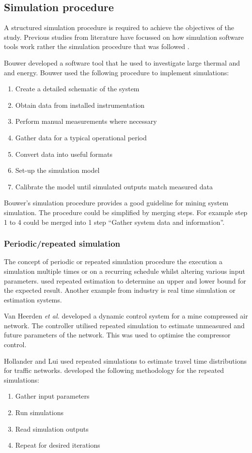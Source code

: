 	\subsection{Simulation procedure}
	A structured simulation procedure is required to achieve the objectives of the study. Previous studies from literature have focussed on how simulation software tools work rather the simulation procedure that was followed \cite{Mare2016PhD}.
	\par
	Bouwer \cite{bouwer2004designing} developed a software tool that he used to investigate large thermal and and energy. Bouwer used the following procedure to implement simulations:
	\begin{enumerate}
		\item Create a detailed schematic of the system
		\item Obtain data from installed instrumentation
		\item Perform manual measurements where necessary
		\item Gather data for a typical operational period
		\item Convert data into useful formats
		\item Set-up the simulation model
		\item Calibrate the model until simulated outputs match measured data
	\end{enumerate}
	Bouwer's simulation procedure provides a good guideline for mining system simulation. The procedure could be simplified by merging steps. For example step 1 to 4 could be merged into 1 step \enquote{Gather system data and information}.
	\subsubsection{Periodic/repeated simulation}
	The concept of periodic or repeated simulation procedure the execution a simulation multiple times or on a recurring schedule whilst altering various input parameters. \cite{Snyman2011Masters} used repeated estimation to determine an upper and lower bound for the expected result. Another example from industry is real time simulation or estimation systems.
	\par 
	 Van Heerden \textit{et al.} \cite{van2014developing} developed a dynamic control system for a mine compressed air network. The controller utilised repeated simulation to estimate unmeasured and future parameters of the network. This was used to optimise the compressor control.
	 \par
	Hollander and Lui \cite{Hollander2008Estimation} used repeated simulations to estimate travel time distributions for traffic networks. \cite{Hollander2008Estimation} developed the following methodology for the repeated simulations:
	\begin{enumerate}
		\item Gather input parameters
		\item Run simulations
		\item Read simulation outputs
		\item Repeat for desired iterations
	\end{enumerate}
